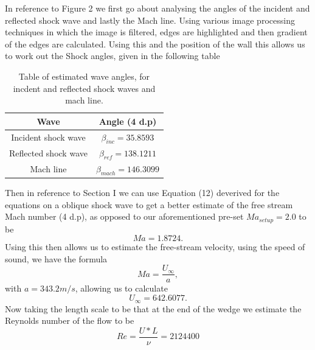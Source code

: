 \documentclass[a4paper,10pt,twoside]{article}
\begin{document}
\begin{multicols}{2}
In reference to Figure 2 we first go about analysing the angles of the incident and reflected shock wave and lastly the Mach line. Using various image processing techniques in which the image is filtered, edges are highlighted and then gradient of the edges are calculated. Using this and the position of the wall this allows us to work out the Shock angles, given in the following table
\begin{table}[H]
\begin{center}
\begin{tabular}{ |c|c| } 
 \hline
 Wave & Angle (4 d.p) \\
 \hline
 Incident shock wave &  $\beta_{inc} = 35.8593$ \\ 
 Reflected shock wave & $\beta_{ref} = 138.1211$ \\ 
 Mach line &  $\beta_{mach} = 146.3099$ \\
\hline
\end{tabular}
\end{center}
\caption{Table of estimated wave angles, for incdent and reflected shock waves and mach line.}
\end{table} \par



Then in reference to Section I we can use Equation (12) deverived for the equations on a oblique shock wave to get a better estimate of the free stream Mach number (4 d.p), as opposed to our aforementioned pre-set $Ma_{setup}=2.0$ to be 
\begin{equation}
    Ma = 1.8724.
\end{equation}
Using this then allows us to estimate the free-stream velocity, using the speed of sound, we have the formula
\begin{equation}
    Ma = \frac{U_{\infty}}{a},
\end{equation}
with $a=343.2m/s$, allowing us to calculate  
\begin{equation}
    U_{\infty} = 642.6077.
\end{equation}
Now taking the length scale to be that at the end of the wedge we estimate the Reynolds number of the flow to be 
\begin{equation}
    Re=\frac{U*L}{\nu} = 2124400
\end{equation} \par




\end{multicols}
\end{document}
